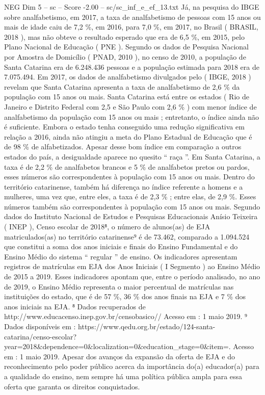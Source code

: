 \begin{textsample}{NEG Dim 5 – sc – Score -2.00 – sc/sc\_inf\_e\_ef\_13.txt}
Já, na pesquisa do IBGE sobre analfabetismo, em 2017, a taxa de analfabetismo de pessoas com 15 anos ou mais de idade caiu de 7,2 \%, em 2016, para 7,0 \%, em 2017, no Brasil ( BRASIL, 2018 ), mas não obteve o resultado esperado que era de 6,5 \%, em 2015, pelo Plano Nacional de Educação ( PNE ).
Segundo os dados de Pesquisa Nacional por Amostra de Domicílio ( PNAD, 2010 ), no censo de 2010, a população de Santa Catarina era de 6.248.436 pessoas e a população estimada para 2018 era de 7.075.494.
Em 2017, os dados de analfabetismo divulgados pelo ( IBGE, 2018 ) revelam que Santa Catarina apresenta a taxa de analfabetismo de 2,6 \% da população com 15 anos ou mais.
Santa Catarina está entre os estados ( Rio de Janeiro e Distrito Federal com 2,5 e São Paulo com 2,6 \% ) com menor índice de analfabetismo da população com 15 anos ou mais ; entretanto, o índice ainda não é suficiente.
Embora o estado tenha conseguido uma redução significativa em relação a 2016, ainda não atingiu a meta do Plano Estadual de Educação que é de 98 \% de alfabetizados.
Apesar desse bom índice em comparação a outros estados do país, a desigualdade aparece no quesito “ raça ”.
Em Santa Catarina, a taxa é de 2,2 \% de analfabetos brancos e 5 \% de analfabetos pretos ou pardos, esses números são correspondentes à população com 15 anos ou mais.
Dentro do território catarinense, também há diferença no índice referente a homens e a mulheres, uma vez que, entre eles, a taxa é de 2,3 \% ; entre elas, de 2,9 \%.
Esses números também são correspondentes à população com 15 anos ou mais.
Segundo dados do Instituto Nacional de Estudos e Pesquisas Educacionais Anísio Teixeira ( INEP ), Censo escolar de 2018⁸, o número de alunos(as) de EJA matriculados(as) no território catarinense⁹ é de 73.462, comparado a 1.094.524 que constitui a soma dos anos iniciais e finais do Ensino Fundamental e do Ensino Médio do sistema “ regular ” de ensino.
Os indicadores apresentam registros de matrículas em EJA dos Anos Iniciais ( I Segmento ) ao Ensino Médio de 2015 a 2019.
Esses indicadores apontam que, entre o período analisado, no ano de 2019, o Ensino Médio representa o maior percentual de matrículas nas instituições do estado, que é de 57 \%, 36 \% dos anos finais na EJA e 7 \% dos anos iniciais na EJA. ⁸ Dados recuperados de http://www.educacenso.inep.gov.br/censobasico// Acesso em : 1 maio 2019. ⁹ Dados disponíveis em : https://www.qedu.org.br/estado/124-santa-catarina/censo-escolar? year=2018\&dependence=0\&localization=0\&education\_stage=0\&item=.
Acesso em : 1 maio 2019.
Apesar dos avanços da expansão da oferta de EJA e do reconhecimento pelo poder público acerca da importância do(a) educador(a) para a qualidade do ensino, nem sempre há uma política pública ampla para essa oferta que garanta os direitos conquistados.

\end{textsample}
